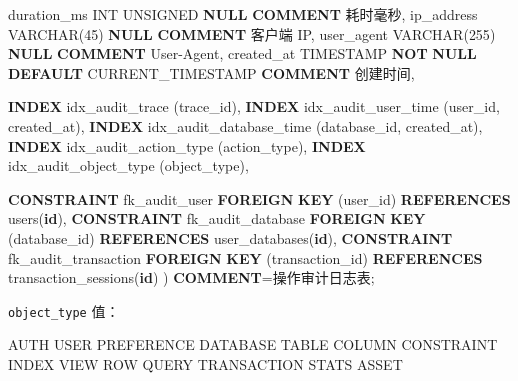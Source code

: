 \documentclass[
  a4paper,
  UTF8]{ctexart}
\newenvironment{Shaded}{}{}
\newcommand{\DataTypeTok}[1]{\textcolor[rgb]{0.56,0.13,0.00}{#1}}
\newcommand{\DecValTok}[1]{\textcolor[rgb]{0.25,0.63,0.44}{#1}}
\newcommand{\FunctionTok}[1]{\textcolor[rgb]{0.02,0.16,0.49}{#1}}
\newcommand{\KeywordTok}[1]{\textcolor[rgb]{0.00,0.44,0.13}{\textbf{#1}}}
\newcommand{\NormalTok}[1]{#1}
\newcommand{\OperatorTok}[1]{\textcolor[rgb]{0.40,0.40,0.40}{#1}}
\newcommand{\StringTok}[1]{\textcolor[rgb]{0.25,0.44,0.63}{#1}}
\begin{document}
\begin{Shaded}
\begin{Highlighting}[]
\NormalTok{  duration\_ms }\DataTypeTok{INT}\NormalTok{ UNSIGNED }\KeywordTok{NULL} \KeywordTok{COMMENT} \StringTok{\textquotesingle{}耗时毫秒\textquotesingle{}}\NormalTok{,}
\NormalTok{  ip\_address }\DataTypeTok{VARCHAR}\NormalTok{(}\DecValTok{45}\NormalTok{) }\KeywordTok{NULL} \KeywordTok{COMMENT} \StringTok{\textquotesingle{}客户端 IP\textquotesingle{}}\NormalTok{,}
\NormalTok{  user\_agent }\DataTypeTok{VARCHAR}\NormalTok{(}\DecValTok{255}\NormalTok{) }\KeywordTok{NULL} \KeywordTok{COMMENT} \StringTok{\textquotesingle{}User{-}Agent\textquotesingle{}}\NormalTok{,}
\NormalTok{  created\_at }\DataTypeTok{TIMESTAMP} \KeywordTok{NOT} \KeywordTok{NULL} \KeywordTok{DEFAULT} \FunctionTok{CURRENT\_TIMESTAMP} \KeywordTok{COMMENT} \StringTok{\textquotesingle{}创建时间\textquotesingle{}}\NormalTok{,}

  \KeywordTok{INDEX}\NormalTok{ idx\_audit\_trace (trace\_id),}
  \KeywordTok{INDEX}\NormalTok{ idx\_audit\_user\_time (user\_id, created\_at),}
  \KeywordTok{INDEX}\NormalTok{ idx\_audit\_database\_time (database\_id, created\_at),}
  \KeywordTok{INDEX}\NormalTok{ idx\_audit\_action\_type (action\_type),}
  \KeywordTok{INDEX}\NormalTok{ idx\_audit\_object\_type (object\_type),}

  \KeywordTok{CONSTRAINT}\NormalTok{ fk\_audit\_user}
    \KeywordTok{FOREIGN} \KeywordTok{KEY}\NormalTok{ (user\_id) }\KeywordTok{REFERENCES}\NormalTok{ users(}\KeywordTok{id}\NormalTok{),}
  \KeywordTok{CONSTRAINT}\NormalTok{ fk\_audit\_database}
    \KeywordTok{FOREIGN} \KeywordTok{KEY}\NormalTok{ (database\_id) }\KeywordTok{REFERENCES}\NormalTok{ user\_databases(}\KeywordTok{id}\NormalTok{),}
  \KeywordTok{CONSTRAINT}\NormalTok{ fk\_audit\_transaction}
    \KeywordTok{FOREIGN} \KeywordTok{KEY}\NormalTok{ (transaction\_id) }\KeywordTok{REFERENCES}\NormalTok{ transaction\_sessions(}\KeywordTok{id}\NormalTok{)}
\NormalTok{) }\KeywordTok{COMMENT}\OperatorTok{=}\StringTok{\textquotesingle{}操作审计日志表\textquotesingle{}}\NormalTok{;}
\end{Highlighting}
\end{Shaded}

\texttt{object\_type} 值：

\begin{Shaded}
\begin{Highlighting}[]
\NormalTok{AUTH}
\NormalTok{USER}
\NormalTok{PREFERENCE}
\NormalTok{DATABASE}
\NormalTok{TABLE}
\NormalTok{COLUMN}
\NormalTok{CONSTRAINT}
\NormalTok{INDEX}
\NormalTok{VIEW}
\NormalTok{ROW}
\NormalTok{QUERY}
\NormalTok{TRANSACTION}
\NormalTok{STATS}
\NormalTok{ASSET}
\end{Highlighting}
\end{Shaded}
\end{document}
